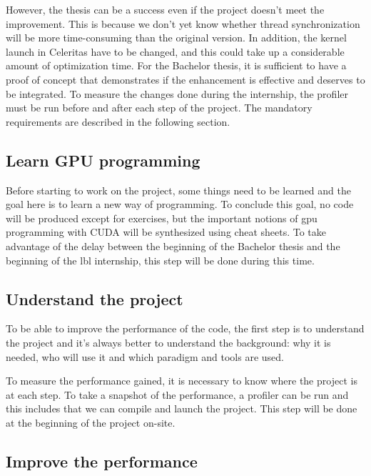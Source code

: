 However, the thesis can be a success even if the project doesn't meet the improvement.
This is because we don't yet know whether thread synchronization will be more
time-consuming than the original version.
In addition, the kernel launch in Celeritas have to be changed, and this
could take up a considerable amount of optimization time.
For the Bachelor thesis, it is sufficient to have a proof of concept that
demonstrates if the enhancement is effective and deserves to be integrated.
To measure the changes done during the internship, the profiler must be run
before and after each step of the project.
The mandatory requirements are described in the following section.

\subsection{Learn GPU programming}
\label{ch:introduction:objectives:learn-gpu-programming}

Before starting to work on the project, some things need to be learned and the goal here is to learn a new way of programming.
To conclude this goal, no code will be produced except for exercises, but the important notions of \acrshort{gpu} programming with CUDA will be synthesized using cheat sheets.
To take advantage of the delay between the beginning of the Bachelor thesis and the beginning of the \acrshort{lbl} internship, this step will be done during this time.


\subsection{Understand the project}
\label{ch:introduction:objectives:understand-the-project}

To be able to improve the performance of the code, the first step is to understand the project and it's always better to understand the background: why it is needed, who will use it and which paradigm and tools are used.

To measure the performance gained, it is necessary to know where the project is at each step.
To take a snapshot of the performance, a profiler can be run and this includes that we can compile and launch the project.
This step will be done at the beginning of the project on-site.


\subsection{Improve the performance}
\label{ch:introduction:objectives:improve-the-performance}

